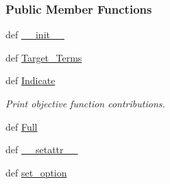 \subsubsection*{Public Member Functions}
\begin{DoxyCompactItemize}
\item 
def \hyperlink{classforcebalance_1_1objective_1_1Objective_a6a315f6d2e8660b433526ee2c73ffea9}{\-\_\-\-\_\-init\-\_\-\-\_\-}
\item 
def \hyperlink{classforcebalance_1_1objective_1_1Objective_aa14af29457c3784b9b97b46186c230ce}{Target\-\_\-\-Terms}
\item 
def \hyperlink{classforcebalance_1_1objective_1_1Objective_a184305cae26dd9be2351297340481ca5}{Indicate}
\begin{DoxyCompactList}\small\item\em Print objective function contributions. \end{DoxyCompactList}\item 
def \hyperlink{classforcebalance_1_1objective_1_1Objective_a3996f95feb58197088775fe439ec697b}{Full}
\item 
def \hyperlink{classforcebalance_1_1BaseClass_a0c851d413c3b2f30561b72a46771bcff}{\-\_\-\-\_\-setattr\-\_\-\-\_\-}
\item 
def \hyperlink{classforcebalance_1_1BaseClass_a73e9a37a7632e79eb99f49bd15aced45}{set\-\_\-option}
\end{DoxyCompactItemize}

